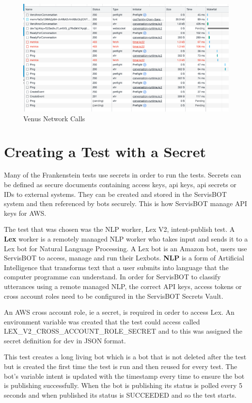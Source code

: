 \documentclass[12pt,a4paper,titlepage]{report}
\begin{document}
\begin{figure}[H]
 \centering
 \includegraphics[width=15cm]{./diagrams/venus_network_calls.png}
 \caption{Venus Network Calls}
\end{figure}

\section{Creating a Test with a Secret}
Many of the Frankenstein tests use secrets in order to run the tests. Secrets can be defined as secure documents containing access keys, api keys, api secrets or IDs to external systems. They can be created and stored in the ServisBOT system and then referenced by bots securely. 
This is how ServisBOT manage API keys for AWS\@.

The test that was chosen was the NLP worker, Lex V2, intent-publish test. A \textbf{Lex} worker is a remotely managed NLP worker who takes input and sends it to a Lex bot for Natural Language Processing. A Lex bot is an Amazon bot, users use ServisBOT to access, manage and run their Lexbots. 
\textbf{NLP} is a form of Artificial Intelligence that transforms text that a user submits into language that the computer programme can understand. In order for ServisBOT to classify utterances using a remote managed NLP, the correct API keys, access tokens or cross account roles need to be configured in the ServisBOT Secrets Vault.

An AWS cross account role, ie a secret, is required in order to access Lex. An environment variable was created that the test could access called LEX\_V2\_CROSS\_ACCOUNT\_ROLE\_SECRET and to this was assigned the secret definition for dev in JSON format. 

This test creates a long living bot which is a bot that is not deleted after the test but is created the first time the test is run and then reused for every test. The bot's variable intent is updated with the timestamp every time to ensure the bot is publishing successfully. When the bot is publishing its status is polled every 5 seconds and when published its status is SUCCEEDED and so the test starts.
\end{document}
